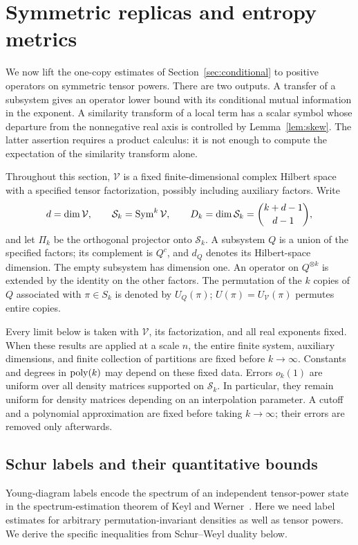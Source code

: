 \section{Symmetric replicas and entropy metrics}\label{sec:replicas}

We now lift the one-copy estimates of Section~\ref{sec:conditional} to
positive operators on symmetric tensor powers.  There are two outputs.
A transfer of a subsystem gives an operator lower bound with its
conditional mutual information in the exponent.  A similarity transform
of a local term has a scalar symbol whose departure from the nonnegative
real axis is controlled by Lemma~\ref{lem:skew}.  The latter assertion
requires a product calculus:
it is not enough to compute the expectation of the similarity transform
alone.

Throughout this section, $\mathcal V$ is a fixed finite-dimensional
complex Hilbert space with a specified tensor factorization, possibly
including auxiliary factors.  Write
\[
 d=\dim\mathcal V,\qquad
 \mathcal S_k=\operatorname{Sym}^k\mathcal V,\qquad
 D_k=\dim\mathcal S_k=\binom{k+d-1}{d-1},
\]
and let $\Pi_k$ be the orthogonal projector onto $\mathcal S_k$.
A subsystem $Q$ is a union of the specified factors; its complement is
$Q^c$, and $d_Q$ denotes its Hilbert-space dimension.  The empty
subsystem has dimension one.  An operator on $Q^{\otimes k}$ is extended
by the identity on the other factors.  The permutation of the $k$
copies of $Q$ associated with $\pi\in S_k$ is denoted by $U_Q(\pi)$;
$U(\pi)=U_{\mathcal V}(\pi)$ permutes entire copies.

Every limit below is taken with $\mathcal V$, its factorization, and all
real exponents fixed.  When these results are applied at a scale $n$,
the entire finite system, auxiliary dimensions, and finite collection of
partitions are fixed before $k\to\infty$.  Constants and degrees in
$\operatorname{poly}(k)$ may depend on these fixed data.  Errors $o_k(1)$ are uniform
over all density matrices supported on $\mathcal S_k$.  In particular,
they remain uniform for density matrices depending on an interpolation
parameter.  A cutoff and a polynomial approximation are fixed before
taking $k\to\infty$; their errors are removed only afterwards.

\subsection{Schur labels and their quantitative bounds}

Young-diagram labels encode the spectrum of an independent tensor-power
state in the spectrum-estimation theorem of Keyl and
Werner~\cite{KeylWerner2001}.  Here we need label estimates for arbitrary
permutation-invariant densities as well as tensor powers.  We derive the
specific inequalities from Schur--Weyl duality below.

